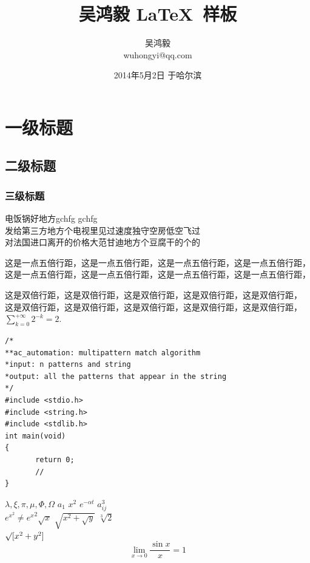 \documentclass[a4paper,11pt]{article}
\title{\yihao\kai 吴鸿毅 \LaTeX~样板}
\author{\sanhao 吴鸿毅\\
\sanhao wuhongyi@qq.com}
\date{\sanhao 2014年5月2日 于哈尔滨}
\newcommand{\sihao}{\fontsize{14pt}{14pt}\selectfont} %
\begin{document}
\maketitle
\thispagestyle{empty}
\newpage
\newpage

\section{\kai 一级标题}
\subsection{\kai 二级标题}
\subsubsection{\kai\sihao 三级标题}
电饭锅好地方gchfg {\roman gchfg}\\
发给第三方地方个电视里见过速度独守空房低空飞过\\
对法国进口离开的价格大范甘迪地方个豆腐干的个的

\begin{onehalfspace} %
这是一点五倍行距，这是一点五倍行距，这是一点五倍行距，这是一点五倍行距，\\
这是一点五倍行距，这是一点五倍行距，这是一点五倍行距，这是一点五倍行距，
\end{onehalfspace}
\doublespacing 这是双倍行距，这是双倍行距，这是双倍行距，这是双倍行距，这是双倍行距，\\
这是双倍行距，这是双倍行距，这是双倍行距，这是双倍行距，这是双倍行距，\\

$\sum_{k=0}^{+\infty}2^{-k}=2$.

\begin{lstlisting}
/*
**ac_automation: multipattern match algorithm
*input: n patterns and string
*output: all the patterns that appear in the string
*/
#include <stdio.h>
#include <string.h>
#include <stdlib.h>
int main(void)
{
       return 0;
       //
}
\end{lstlisting}

$\lambda,\xi,\pi,\mu,\Phi,\Omega$
$a_{1}$ \qquad $x^{2}$ \qquad
$e^{-\alpha t}$ \qquad
$a^{3}_{ij}$\\
$e^{x^2} \neq {e^x}^2$$\sqrt{x}$ \qquad
$\sqrt{ x^{2}+\sqrt{y} }$
\qquad $\sqrt[3]{2}$\\[3pt]
$\surd[x^2 + y^2]$
\[\lim_{x \rightarrow 0}
\frac{\sin x}{x}=1\]
\end{document}
